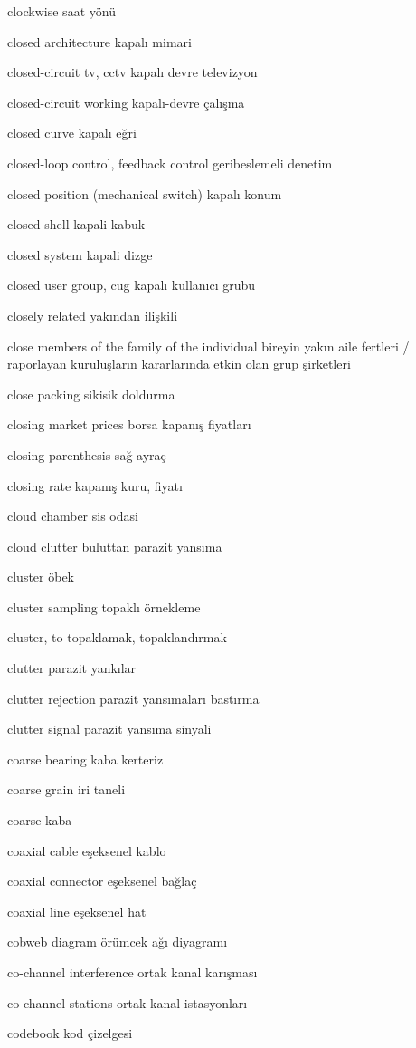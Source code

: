 \documentclass[12pt,fleqn]{article}\usepackage{../../common}
\begin{document}
clockwise saat yönü

closed architecture kapalı mimari

closed-circuit tv, cctv kapalı devre televizyon

closed-circuit working kapalı-devre çalışma

closed curve kapalı eğri

closed-loop control, feedback control geribeslemeli denetim

closed position (mechanical switch) kapalı konum

closed shell kapali kabuk

closed system kapali dizge

closed user group, cug kapalı kullanıcı grubu

closely related yakından ilişkili

close members of the family of the individual bireyin yakın aile fertleri / raporlayan kuruluşların kararlarında etkin olan grup şirketleri

close packing sikisik doldurma

closing market prices borsa kapanış fiyatları

closing parenthesis sağ ayraç

closing rate kapanış kuru, fiyatı

cloud chamber sis odasi

cloud clutter buluttan parazit yansıma

cluster öbek

cluster sampling topaklı örnekleme

cluster, to topaklamak, topaklandırmak

clutter parazit yankılar

clutter rejection parazit yansımaları bastırma

clutter signal parazit yansıma sinyali

coarse bearing kaba kerteriz

coarse grain iri taneli

coarse kaba

coaxial cable eşeksenel kablo

coaxial connector eşeksenel bağlaç

coaxial line eşeksenel hat

cobweb diagram örümcek ağı diyagramı

co-channel interference ortak kanal karışması

co-channel stations ortak kanal istasyonları

codebook kod çizelgesi
\end{document}
